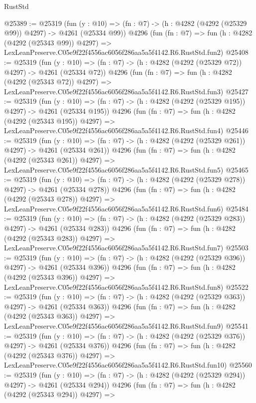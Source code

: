 \begin{lexlean}{RustStd}
\begin{coremodule}
@25389 := @25319
    (fun (y : @10) => (fn : @7) -> (h : @4282 (@4292 (@25329 @99)) @4297) -> @4261 (@25334 @99))
    @4296
    (fun (fn : @7) =>
    fun (h : @4282 (@4292 (@25343 @99)) @4297) =>
    LexLeanPreserve.C05e9f22f4556ac6056f286aa5a5f4142.R6.RustStd.fun2)
@25408 := @25319
    (fun (y : @10) => (fn : @7) -> (h : @4282 (@4292 (@25329 @72)) @4297) -> @4261 (@25334 @72))
    @4296
    (fun (fn : @7) =>
    fun (h : @4282 (@4292 (@25343 @72)) @4297) =>
    LexLeanPreserve.C05e9f22f4556ac6056f286aa5a5f4142.R6.RustStd.fun3)
@25427 := @25319
    (fun (y : @10) => (fn : @7) -> (h : @4282 (@4292 (@25329 @195)) @4297) -> @4261 (@25334 @195))
    @4296
    (fun (fn : @7) =>
    fun (h : @4282 (@4292 (@25343 @195)) @4297) =>
    LexLeanPreserve.C05e9f22f4556ac6056f286aa5a5f4142.R6.RustStd.fun4)
@25446 := @25319
    (fun (y : @10) => (fn : @7) -> (h : @4282 (@4292 (@25329 @261)) @4297) -> @4261 (@25334 @261))
    @4296
    (fun (fn : @7) =>
    fun (h : @4282 (@4292 (@25343 @261)) @4297) =>
    LexLeanPreserve.C05e9f22f4556ac6056f286aa5a5f4142.R6.RustStd.fun5)
@25465 := @25319
    (fun (y : @10) => (fn : @7) -> (h : @4282 (@4292 (@25329 @278)) @4297) -> @4261 (@25334 @278))
    @4296
    (fun (fn : @7) =>
    fun (h : @4282 (@4292 (@25343 @278)) @4297) =>
    LexLeanPreserve.C05e9f22f4556ac6056f286aa5a5f4142.R6.RustStd.fun6)
@25484 := @25319
    (fun (y : @10) => (fn : @7) -> (h : @4282 (@4292 (@25329 @283)) @4297) -> @4261 (@25334 @283))
    @4296
    (fun (fn : @7) =>
    fun (h : @4282 (@4292 (@25343 @283)) @4297) =>
    LexLeanPreserve.C05e9f22f4556ac6056f286aa5a5f4142.R6.RustStd.fun7)
@25503 := @25319
    (fun (y : @10) => (fn : @7) -> (h : @4282 (@4292 (@25329 @396)) @4297) -> @4261 (@25334 @396))
    @4296
    (fun (fn : @7) =>
    fun (h : @4282 (@4292 (@25343 @396)) @4297) =>
    LexLeanPreserve.C05e9f22f4556ac6056f286aa5a5f4142.R6.RustStd.fun8)
@25522 := @25319
    (fun (y : @10) => (fn : @7) -> (h : @4282 (@4292 (@25329 @363)) @4297) -> @4261 (@25334 @363))
    @4296
    (fun (fn : @7) =>
    fun (h : @4282 (@4292 (@25343 @363)) @4297) =>
    LexLeanPreserve.C05e9f22f4556ac6056f286aa5a5f4142.R6.RustStd.fun9)
@25541 := @25319
    (fun (y : @10) => (fn : @7) -> (h : @4282 (@4292 (@25329 @376)) @4297) -> @4261 (@25334 @376))
    @4296
    (fun (fn : @7) =>
    fun (h : @4282 (@4292 (@25343 @376)) @4297) =>
    LexLeanPreserve.C05e9f22f4556ac6056f286aa5a5f4142.R6.RustStd.fun10)
@25560 := @25319
    (fun (y : @10) => (fn : @7) -> (h : @4282 (@4292 (@25329 @294)) @4297) -> @4261 (@25334 @294))
    @4296
    (fun (fn : @7) =>
    fun (h : @4282 (@4292 (@25343 @294)) @4297) =>

\end{coremodule}
\end{lexlean}
